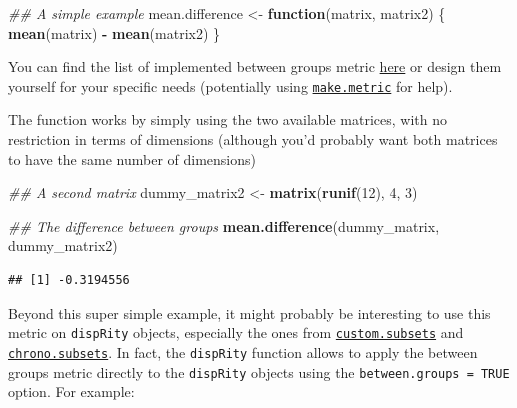 \documentclass[]{book}
\newenvironment{Shaded}{\begin{snugshade}}{\end{snugshade}}
\newcommand{\CommentTok}[1]{\textcolor[rgb]{0.56,0.35,0.01}{\textit{#1}}}
\newcommand{\ControlFlowTok}[1]{\textcolor[rgb]{0.13,0.29,0.53}{\textbf{#1}}}
\newcommand{\DecValTok}[1]{\textcolor[rgb]{0.00,0.00,0.81}{#1}}
\newcommand{\KeywordTok}[1]{\textcolor[rgb]{0.13,0.29,0.53}{\textbf{#1}}}
\newcommand{\NormalTok}[1]{#1}
\newcommand{\OperatorTok}[1]{\textcolor[rgb]{0.81,0.36,0.00}{\textbf{#1}}}
\newcommand{\StringTok}[1]{\textcolor[rgb]{0.31,0.60,0.02}{#1}}
\begin{document}
\begin{Shaded}
\begin{Highlighting}[]
\CommentTok{## A simple example}
\NormalTok{mean.difference <-}\StringTok{ }\ControlFlowTok{function}\NormalTok{(matrix, matrix2) \{}
  \KeywordTok{mean}\NormalTok{(matrix) }\OperatorTok{-}\StringTok{ }\KeywordTok{mean}\NormalTok{(matrix2)}
\NormalTok{\}}
\end{Highlighting}
\end{Shaded}

You can find the list of implemented between groups metric \protect\hyperlink{betweengroupmetricslist}{here} or design them yourself for your specific needs (potentially using \protect\hyperlink{makemetric}{\texttt{make.metric}} for help).

The function works by simply using the two available matrices, with no restriction in terms of dimensions (although you'd probably want both matrices to have the same number of dimensions)

\begin{Shaded}
\begin{Highlighting}[]
\CommentTok{## A second matrix}
\NormalTok{dummy_matrix2 <-}\StringTok{ }\KeywordTok{matrix}\NormalTok{(}\KeywordTok{runif}\NormalTok{(}\DecValTok{12}\NormalTok{), }\DecValTok{4}\NormalTok{, }\DecValTok{3}\NormalTok{)}

\CommentTok{## The difference between groups}
\KeywordTok{mean.difference}\NormalTok{(dummy_matrix, dummy_matrix2)}
\end{Highlighting}
\end{Shaded}

\begin{verbatim}
## [1] -0.3194556
\end{verbatim}

Beyond this super simple example, it might probably be interesting to use this metric on \texttt{dispRity} objects, especially the ones from \protect\hyperlink{custom-subsets}{\texttt{custom.subsets}} and \protect\hyperlink{chrono-subsets}{\texttt{chrono.subsets}}.
In fact, the \texttt{dispRity} function allows to apply the between groups metric directly to the \texttt{dispRity} objects using the \texttt{between.groups\ =\ TRUE} option.
For example:
\end{document}
